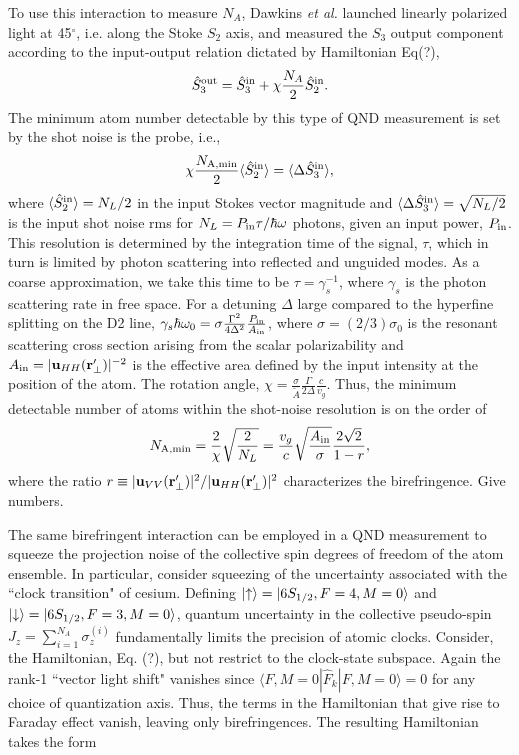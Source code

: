 \documentclass[preprint,aps,pra,onecolumn]{revtex4-1} %
\begin{document}
To use this interaction to measure $N_A$, Dawkins {\em et al.} launched linearly polarized light at 45$^\circ$, i.e. along the Stoke $S_2$ axis, and measured the $S_3$ output component according to the input-output relation dictated by Hamiltonian Eq(?),
\begin{equation}
\hat{S}_3^{\rm out} = \hat{S}_3^{\rm in} + \chi \frac{N_A}{2} \hat{S}_2^{\rm in}.
\end{equation}
The minimum atom number detectable by this type of QND measurement is set by the shot noise is the probe, i.e.,
\begin{equation}
\chi \frac{N_{\rm A, min}}{2} \langle \hat{S}_2^{\rm in}\rangle =  \langle \Delta \hat{S}_3^{\rm in}\rangle,
\end{equation}
where $\langle \hat{S}_2^{\rm in}\rangle  =N_L/2$ in the input Stokes vector magnitude and  $\langle  \Delta\hat{S}_3^{\rm in}\rangle = \sqrt{N_L/2}$ is the input shot noise rms for $N_L = P_{\rm in}\tau/\hbar\omega$ photons, given an input power, $ P_{\rm in}$.  This resolution is determined by the integration time of the signal, $\tau$, which in turn is limited by photon scattering into reflected and unguided modes. As a coarse approximation, we take this time to be $\tau=\gamma_s^{-1}$, where $\gamma_s$ is the photon scattering rate in free space.  For a detuning $\Delta$ large compared to the hyperfine splitting on the D2 line, $\gamma_s \hbar \omega_0=  \sigma \frac{\Gamma^2}{4 \Delta^2}\frac{P_{\rm in}}{A_{\rm in}}$, where $\sigma = (2/3) \sigma_0$ is the resonant scattering cross section arising from the scalar polarizability and $A_{\rm in}=|\mathbf{u}_{HH}(\mathbf{r}'_\perp)|^{-2}$ is the effective area defined by the input intensity at the position of the atom.  The rotation angle, $\chi = \frac{\sigma}{\tilde{A}}\frac{\Gamma}{2\Delta}\frac{c}{v_g}$.  Thus, the minimum detectable number of atoms within the shot-noise resolution is on the order of
\begin{equation}
N_{\rm A, min} = \frac{2}{\chi}\sqrt{\frac{2}{N_L}} = \frac{v_g}{c}\sqrt {\frac{A_{\rm in}}{\sigma}} \frac{  2 \sqrt{2}}{1-r},
\end{equation}
where the ratio $r \equiv |\mathbf{u}_{VV}(\mathbf{r}'_\perp)| ^2/|\mathbf{u}_{HH}(\mathbf{r}'_\perp)|^2$ characterizes the birefringence. {\color{red}  Give numbers}.

The same birefringent interaction can be employed in a QND measurement to squeeze the projection noise of the collective spin degrees of freedom of the atom ensemble.  In particular, consider squeezing of the uncertainty associated with the ``clock transition" of cesium.  Defining $\lvert{\uparrow}\rangle = \lvert{6S_{1/2}, F=4, M=0}\rangle$ and $\lvert{\downarrow}\rangle = \lvert{6S_{1/2}, F=3, M=0}\rangle$, quantum uncertainty in the collective pseudo-spin $J_z = \sum_{i=1}^{N_A} \sigma_z^{(i)}$ fundamentally limits the precision of atomic clocks.  Consider, the Hamiltonian, Eq. (?), but not restrict to the clock-state subspace. Again the  rank-1 ``vector light shift" vanishes since $\langle F, M=0 | \hat{F}_k | F, M=0 \rangle = 0$ for any choice of quantization axis. Thus, the terms in the Hamiltonian that give rise to Faraday effect vanish, leaving only birefringences.  The resulting Hamiltonian takes the form
\end{document}
